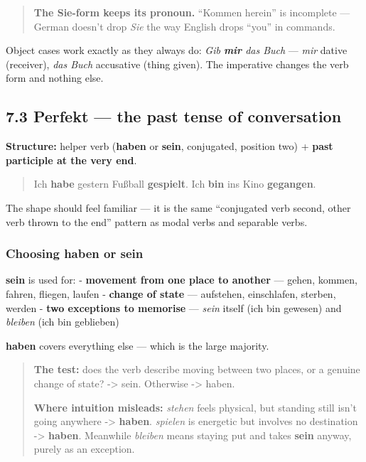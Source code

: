 \documentclass[
  11pt,
]{article}
\begin{document}
\begin{quote}
\textbf{The Sie-form keeps its pronoun.} ``Kommen herein'' is incomplete
--- German doesn't drop \emph{Sie} the way English drops ``you'' in
commands.
\end{quote}

Object cases work exactly as they always do: \emph{Gib \textbf{mir} das
Buch} --- \emph{mir} dative (receiver), \emph{das Buch} accusative
(thing given). The imperative changes the verb form and nothing else.

\subsection{7.3 Perfekt --- the past tense of
conversation}\label{perfekt-the-past-tense-of-conversation}

\textbf{Structure:} helper verb (\textbf{haben} or \textbf{sein},
conjugated, position two) + \textbf{past participle at the very end}.

\begin{quote}
Ich \textbf{habe} gestern Fußball \textbf{gespielt}. Ich \textbf{bin}
ins Kino \textbf{gegangen}.
\end{quote}

The shape should feel familiar --- it is the same ``conjugated verb
second, other verb thrown to the end'' pattern as modal verbs and
separable verbs.

\subsubsection{Choosing haben or sein}\label{choosing-haben-or-sein}

\textbf{sein} is used for: - \textbf{movement from one place to another}
--- gehen, kommen, fahren, fliegen, laufen - \textbf{change of state}
--- aufstehen, einschlafen, sterben, werden - \textbf{two exceptions to
memorise} --- \emph{sein} itself (ich bin gewesen) and \emph{bleiben}
(ich bin geblieben)

\textbf{haben} covers everything else --- which is the large majority.

\begin{quote}
\textbf{The test:} does the verb describe moving between two places, or
a genuine change of state? -\textgreater{} sein. Otherwise
-\textgreater{} haben.

\textbf{Where intuition misleads:} \emph{stehen} feels physical, but
standing still isn't going anywhere -\textgreater{} \textbf{haben}.
\emph{spielen} is energetic but involves no destination -\textgreater{}
\textbf{haben}. Meanwhile \emph{bleiben} means staying put and takes
\textbf{sein} anyway, purely as an exception.
\end{quote}
\end{document}
